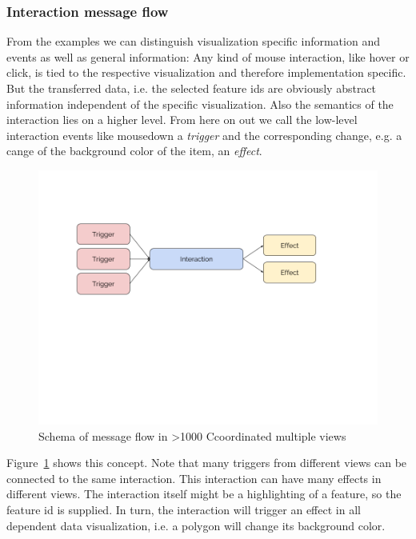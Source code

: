 \documentclass{article}
\newcommand\hmm[1]{\ifnum\ifhmode\spacefactor\else2000\fi>1000 \uppercase{#1}\else#1\fi}
\newcommand{\cmvs}{\hmm{c}oordinated multiple views}
\begin{document}
\subsubsection{Interaction message flow}

From the examples we can distinguish visualization specific information and events as well as general information:
Any kind of mouse interaction, like hover or click, is tied to the respective visualization and therefore implementation specific.
But the transferred data, i.e. the selected feature ids are obviously abstract information independent of the specific visualization.
Also the semantics of the interaction lies on a higher level. 
From here on out we call the low-level interaction events like mousedown a \emph{trigger} and the corresponding change, e.g. a cange of the background color of the item, an \emph{effect}.

\begin{figure}[h!]
  \centering
  \includegraphics[width=\textwidth]{images/trigger-effect.png}
  \caption{Schema of message flow in \cmvs{}}
  \label{fig:concept:trigger-effect}
\end{figure}


Figure~\ref{fig:concept:trigger-effect} shows this concept.
Note that many triggers from different views can be connected to the same interaction.
This interaction can have many effects in different views.
The interaction itself might be a highlighting of a feature, so the feature id is supplied.
In turn, the interaction will trigger an effect in all dependent data visualization, i.e. a polygon will change its background color.
\end{document}
